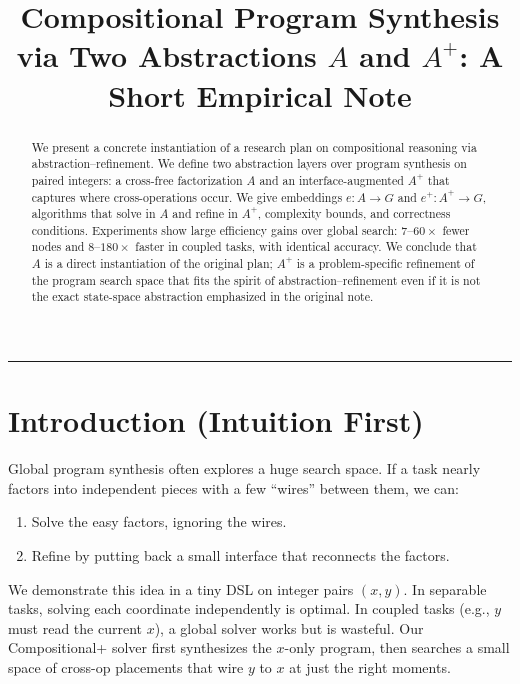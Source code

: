 \documentclass[11pt]{article}
\begin{document}
\title{Compositional Program Synthesis via Two Abstractions $A$ and $A^{+}$: A Short Empirical Note}
\author{}
\date{}
\maketitle

\begin{abstract}
We present a concrete instantiation of a research plan on compositional reasoning via abstraction--refinement. We define two abstraction layers over program synthesis on paired integers: a cross-free factorization $A$ and an interface-augmented $A^{+}$ that captures where cross-operations occur. We give embeddings $e:A\!\to\!G$ and $e^{+}:A^{+}\!\to\!G$, algorithms that solve in $A$ and refine in $A^{+}$, complexity bounds, and correctness conditions. Experiments show large efficiency gains over global search: $7$--$60\times$ fewer nodes and $8$--$180\times$ faster in coupled tasks, with identical accuracy. We conclude that $A$ is a direct instantiation of the original plan; $A^{+}$ is a problem-specific refinement of the program search space that fits the spirit of abstraction--refinement even if it is not the exact state-space abstraction emphasized in the original note.
\end{abstract}

\vspace{6pt}\noindent\rule{\textwidth}{0.4pt}\vspace{6pt}

\section{Introduction (Intuition First)}

Global program synthesis often explores a huge search space. If a task nearly factors into independent pieces with a few ``wires'' between them, we can:
\begin{enumerate}
    \item Solve the easy factors, ignoring the wires.
    \item Refine by putting back a small interface that reconnects the factors.
\end{enumerate}

We demonstrate this idea in a tiny DSL on integer pairs $(x,y)$. In separable tasks, solving each coordinate independently is optimal. In coupled tasks (e.g., $y$ must read the current $x$), a global solver works but is wasteful. Our Compositional+ solver first synthesizes the $x$-only program, then searches a small space of cross-op placements that wire $y$ to $x$ at just the right moments.
\end{document}
